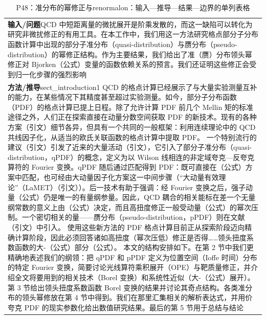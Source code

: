 \documentclass[UTF8,11pt,oneside]{ctexbook}
\begin{document}
\begin{table}[htbp]
  \centering
  \caption*{P48：准分布的幂修正与renormalon：输入—推导—结果—边界的单列表格}
  \small
  \begin{tabular}{@{}p{}@{}}
    \toprule
    \textbf{输入/问题}\quad QCD 中短距离量的微扰展开是阶乘发散的，而这一缺陷可以转化为研究非微扰修正的有用工具。在本工作中，我们用这一方法研究格点部分子分布函数计算中出现的部分子准分布（quasi-distribution）与赝分布（pseudo-distribution）的幂修正结构。作为主要结果，我们给出了准（赝）分布领头幂修正对 Bjorken（公式）变量的函数依赖关系的预言。我们还证明这些修正会受到归一化步骤的强烈影响 \\
    \textbf{方法/推导}\quad sect\_introduction1 QCD 的格点计算已经展示了与大量实验测量互补的能力，在某些情况下其精度甚至超过实验测量。如今，部分子分布函数（PDF）的格点计算已提上日程。除了允许计算 PDF 前几个 Mellin 矩的标准途径之外，人们正在探索直接在动量分数空间获取 PDF 的新技术。现有的各种方案（引文）细节各异，但具有一个共同的一般框架：利用连续理论中的 QCD 共线因子化，从适当的欧氏关联函数的格点计算中提取 PDF。 一个特别流行的建议（引文）引发了近来的大量活动（引文），它引入了部分子准分布（quasi-distribution，qPDF）的概念，定义为以 Wilson 线相连的非定域夸克—反夸克算符的 Fourier 变换。qPDF 随后通过匹配得到 PDF：既可直接在（公式）方案中匹配，也可经由大动量因子化方案这一中间步骤（``大动量有效理论''（LaMET）（引文））。后一技术有助于强调：经 Fourier 变换之后，强子动量（公式）仍是唯一的有量纲参量。因此，QCD 耦合的相关能标在差一个无量纲常数的意义上由（公式）决定，而且高扭度修正一般受动量（公式）的幂次压制。一个密切相关的量——赝分布（pseudo-distribution，pPDF）则在文献（引文）中引入。 使用这些新方法的 PDF 格点计算目前正从探索阶段迈向精确计算阶段，因此必须回答诸如高扭度（幂次压低）修正是否得……领头扭度系数函数的大-（公式）部分（公式）。 本文的结构安排如下。在第 2 节中我们更精确地表述我们的纲领：把 qPDF 和 pPDF 定义为位置空间（Ioffe 时间）分布的特定 Fourier 变换，简要讨论光线算符乘积展开（OPE）与靶质量修正，并介绍全文将要用到的相关技术（Borel 变换）和系统性近似（大-（公式）展开）。第 3 节给出领头扭度系数函数 Borel 变换的结果并讨论其奇点结构。各类准分布的领头幂修放在第 4 节中得到。我们在那里汇集相关的解析表达式，并用价夸克 PDF 的现实参数化给出数值研究结果。最后的第 5 节用于总结与结论 \\

\end{tabular}
\end{table}
\end{document}
